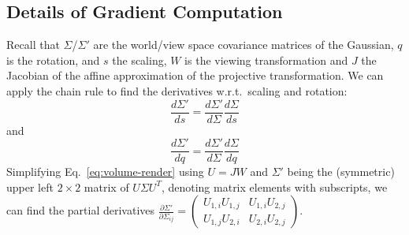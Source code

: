 
\begin{appendix}
	\section{Details of Gradient Computation}
	\label{sec:appa}
	Recall that $\Sigma$/$\Sigma'$ are the world/view space covariance matrices of the Gaussian, $q$ is the rotation, and $s$ the scaling, $W$ is the viewing transformation and $J$ the Jacobian of the affine approximation of the projective transformation.
	We can apply the chain rule to find the derivatives w.r.t.\ scaling and rotation:
	\begin{equation}
		\frac{d\Sigma'}{ds} = \frac{d\Sigma'}{d\Sigma}\frac{d\Sigma}{ds}
	\end{equation}
	and
	\begin{equation}
		\frac{d\Sigma'}{dq} = \frac{d\Sigma'}{d\Sigma}\frac{d\Sigma}{dq}
	\end{equation}
	Simplifying Eq.~\ref{eq:volume-render} using $U = JW$ and $\Sigma'$ being the (symmetric) upper left $2\times2$ matrix of $U \Sigma U^T$, denoting matrix elements with subscripts, we can find the  partial derivatives
	$
		\frac{\partial \Sigma'}{\partial \Sigma_{ij}} = \left(\begin{smallmatrix}
			U_{1,i}U_{1,j} & U_{1,i} U_{2,j}\\
			U_{1,j} U_{2,i} & U_{2,i}U_{2,j}
		\end{smallmatrix}\right)
	$.


\end{appendix}
